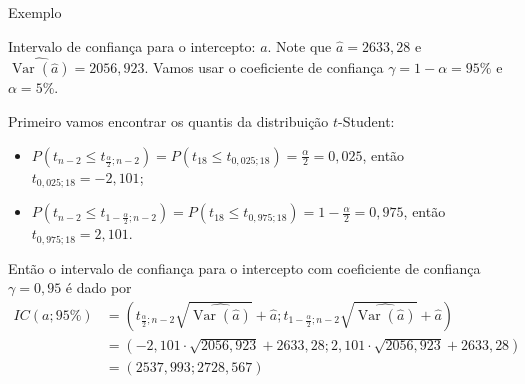 \documentclass[8pt]{beamer}
\DeclareMathOperator{\vari}{Var}
\begin{document}
\begin{frame}{Exemplo}

\begin{block}{Intervalo de confiança para o intercepto: $a$.}
	Note que $\hat{a} = 2633,28$ e $\widehat{\vari({\hat{a}})} = 2056,923$. Vamos usar o coeficiente de confiança $\gamma = 1 - \alpha = 95\%$ e $\alpha=5\%$.
	
	Primeiro vamos encontrar os quantis da distribuição $t$-Student:
	\begin{itemize}
		\item $P(t_{n-2} \leq t_{\frac{\alpha}{2};n-2}) = P(t_{18} \leq t_{0,025; 18}) = \frac{\alpha}{2} = 0,025$, então $t_{0,025; 18} = -2,101$;
		\item $P(t_{n-2} \leq t_{1-\frac{\alpha}{2};n-2}) = P(t_{18} \leq t_{0,975; 18}) = 1-\frac{\alpha}{2} = 0,975$, então $t_{0,975; 18} = 2,101$.
	\end{itemize}
	Então o intervalo de confiança para o intercepto com coeficiente de confiança $\gamma = 0,95$ é dado por
	\begin{align*}
		IC\left(a;95\%\right) &= \left( t_{\frac{\alpha}{2};n-2} \sqrt{\widehat{\vari({\hat{a}})}} + \hat{a}; t_{1-\frac{\alpha}{2};n-2} \sqrt{\widehat{\vari({\hat{a}})}} + \hat{a} \right)\\
		&= \left( -2,101 \cdot \sqrt{2056,923} + 2633,28; 2,101 \cdot \sqrt{2056,923} + 2633,28 \right)\\
		&=  \left( 2537,993; 2728,567 \right)
	\end{align*}
\end{block}

\end{frame}
\end{document}
